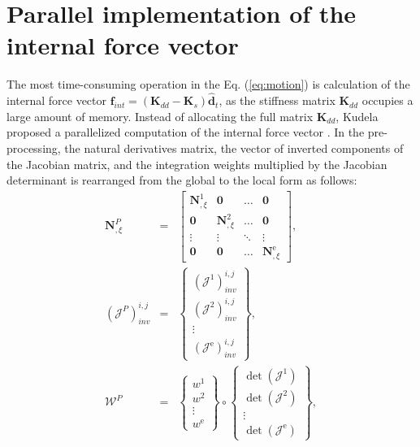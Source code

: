 \section{Parallel implementation of the internal force vector}
\label{sec:gpu}


The most time-consuming operation in the Eq. (\ref{eq:motion}) is calculation of the internal force vector \(\textbf{f}_{int}=\left(\textbf{K}_{dd}-\textbf{K}_{s}\right)\widehat{\textbf{d}}_{t}\), as the stiffness matrix \(\textbf{K}_{dd}\) occupies a large amount of memory.
%
Instead of allocating the full matrix \(\textbf{K}_{dd}\), Kudela proposed a parallelized computation of the internal force vector \cite{kudela2016parallel}.
In the pre-processing, the natural derivatives matrix, the vector of inverted components of the Jacobian matrix, and the integration weights multiplied by the Jacobian determinant is rearranged from the global to the local form as follows:
\begin{eqnarray}
	\label{eq:isoparametric}
	\textbf{N}^P_{,\xi} & = & \left[ \begin{array}{cccc}
		\textbf{N}^{1}_{,\xi} & \textbf{0} & \ldots & \textbf{0}\\
		\textbf{0} & \textbf{N}^{2}_{,\xi} & \ldots & \textbf{0}\\
		\vdots & \vdots &  \ddots & \vdots\\
		\textbf{0} & \textbf{0} & \ldots & \textbf{N}^{\mathrm{e}}_{,\xi}
	\end{array}\right],\\
	\label{eq:jacob}
	\left(\mathcal{J}^P\right)^{i,j}_{inv} & = & \left\{ \begin{array}{c}
		\left(\mathcal{J}^{1}\right)^{i,j}_{inv}\\
		\left(\mathcal{J}^{2}\right)^{i,j}_{inv}\\
		\vdots\\
		\left(\mathcal{J}^{\mathrm{e}}\right)^{i,j}_{inv} \end{array}\right\},\\
	\label{eq:intWeights}
	\mathcal{W}^P & = & \left\{ \begin{array}{c}
		w^{1}\\
		w^{2}\\
		\vdots\\
		w^{\mathrm{e}} \end{array}\right\} \circ
	\left\{ \begin{array}{c}
		\det\left(\mathcal{J}^{1}\right)\\
		\det\left(\mathcal{J}^{2}\right)\\
		\vdots\\
		\det\left(\mathcal{J}^{\mathrm{e}}\right)
	 \end{array}\right\},
\end{eqnarray}
